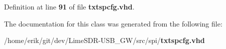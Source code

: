Definition at line {\bf 91} of file {\bf txtspcfg.\+vhd}.



The documentation for this class was generated from the following file\+:\begin{DoxyCompactItemize}
\item 
/home/erik/git/dev/\+Lime\+S\+D\+R-\/\+U\+S\+B\+\_\+\+G\+W/src/spi/{\bf txtspcfg.\+vhd}\end{DoxyCompactItemize}
